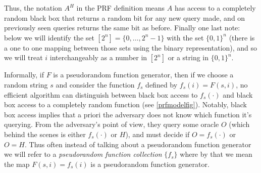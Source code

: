 
Thus, the notation \(A^H\) in the PRF definition means \(A\) has access
to a completely random black box that returns a random bit for any new
query made, and on previously seen queries returns the same bit as
before. Finally one last note: below we will identify the set
\([2^n] = \{0,\ldots,2^n-1\}\) with the set \(\{0,1\}^n\) (there is a
one to one mapping between those sets using the binary representation),
and so we will treat \(i\) interchangeably as a number in \([2^n]\) or a
string in \(\{0,1\}^n\).

Informally, if \(F\) is a pseudorandom function generator, then if we
choose a random string \(s\) and consider the function \(f_s\) defined
by \(f_s(i) = F(s,i)\), no efficient algorithm can distinguish between
black box access to \(f_s(\cdot)\) and black box access to a completely
random function (see \cref{prfmodelfig}). Notably, black box access
implies that a priori the adversary does not know which function it's
querying. From the adversary's point of view, they query some oracle
\(O\) (which behind the scenes is either \(f_s(\cdot)\) or \(H\)), and
must decide if \(O = f_s(\cdot)\) or \(O = H\). Thus often instead of
talking about a pseudorandom function generator we will refer to a
\emph{pseudorandom function collection} \(\{ f_s \}\) where by that we
mean the map \(F(s,i)=f_s(i)\) is a pseudorandom function generator.


